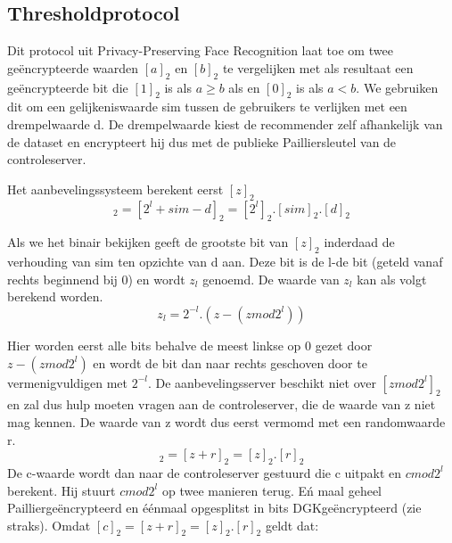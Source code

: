 \subsection{Thresholdprotocol}
\label{threshold}

Dit protocol uit Privacy-Preserving Face Recognition \cite{facerecog} laat toe om twee ge\"encrypteerde waarden $[a]_2$ en $[b]_2$ te vergelijken met als resultaat een ge\"encrypteerde bit die $[1]_2$ is als $a \geq b$ als en $[0]_2$ is als $a < b$. We gebruiken dit om een gelijkeniswaarde sim tussen de gebruikers te verlijken met een drempelwaarde d. De drempelwaarde kiest de recommender zelf afhankelijk van de dataset en encrypteert hij dus met de publieke Pailliersleutel van de controleserver.

Het aanbevelingssysteem berekent eerst $[z]_2$
\begin{equation}
[z]_2 = [2^l + sim - d]_2 =[2^l]_2.[sim]_2.[d]_2  \end{equation}

Als we het binair bekijken geeft de grootste bit van $[z]_2$  inderdaad de verhouding van sim ten opzichte van d aan.
Deze bit is de l-de bit (geteld vanaf rechts beginnend bij 0) en wordt $z_l$ genoemd. De waarde van $z_l$ kan als volgt berekend worden.
\begin{equation}
\label{zl}
z_l = 2^{-l}.(z-(zmod2^l)) \end{equation}

Hier worden eerst alle bits behalve de meest linkse op 0 gezet door $z-(zmod2^l)$ en wordt de bit dan naar rechts geschoven door te vermenigvuldigen met $2^{-l}$. De aanbevelingsserver beschikt niet over $[zmod2^l]_2$ en zal dus hulp moeten vragen aan de controleserver, die de waarde van z niet mag kennen. De waarde van z wordt dus eerst vermomd met een randomwaarde r.
\begin{equation}
[c]_2= [z+r]_2 = [z]_2.[r]_2 \end{equation}
De c-waarde wordt dan naar de controleserver gestuurd die c uitpakt en $cmod2^l$ berekent. Hij stuurt $cmod2^l$ op twee manieren terug. E\'n maal geheel Paillierge\"encrypteerd en \'e\'enmaal opgesplitst in bits DGKge\"encrypteerd (zie straks). Omdat $[c]_2= [z+r]_2 = [z]_2.[r]_2$ geldt dat:

